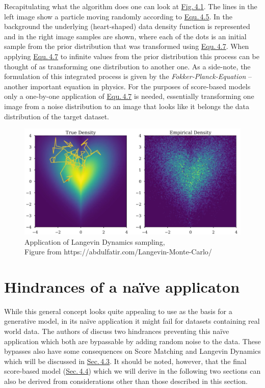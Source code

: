 Recapitulating what the algorithm does one can look at \hyperref[fig:4.1]{Fig.\,4.1}. The lines in the left image show a particle moving randomly according to \hyperref[equ:4.5]{Equ.\,4.5}. In the background the underlying (heart-shaped) data density function  is represented and in the right image samples are shown, where each of the dots is an initial sample from the prior distribution that was transformed using \hyperref[equ:4.7]{Equ.\,4.7}. When applying \hyperref[equ:4.7]{Equ.\,4.7} to infinite values from the prior distribution this process can be thought of as transforming one distribution to another one. As a side-note, the formulation of this integrated process is given by the \textit{Fokker-Planck-Equation} \cite{gardiner} – another important equation in physics. For the purposes of score-based models only a one-by-one application of \hyperref[equ:4.7]{Equ.\,4.7} is needed, essentially transforming one image from a noise distribution to an image that looks like it belongs the data distribution of the target dataset.
%
\begin{figure}[] \label{fig:4.1}
    \centering
    \includegraphics[width=.8\textwidth]{Chapters/figures/langevin.PNG}
    \caption{Application of Langevin Dynamics sampling, \\Figure from https://abdulfatir.com/Langevin-Monte-Carlo/}
\end{figure}
\section{Hindrances of a na\"{i}ve applicaton} \label{sec:4.2}
While this general concept looks quite appealing to use as the basis for a generative model, in its na\"{i}ve application it might fail for datasets containing real world data. The authors of \cite{score_1} discuss two hindrances preventing this na\"{i}ve application which both are bypassable by adding random noise to the data. These bypasses also have some consequences on Score Matching and Langevin Dynamics which will be discussed in \hyperref[sec:4.3]{Sec.\,4.3}. It should be noted, however, that the final score-based model (\hyperref[sec:4.4]{Sec.\,4.4}) which we will derive in the following two sections can also be derived from considerations other than those described in this section.
%
